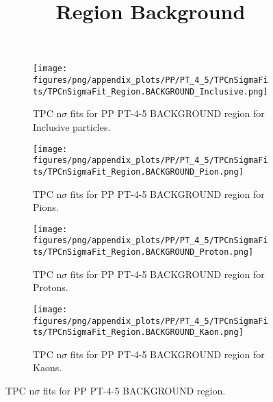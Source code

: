             \begin{figure}[H]
                \title{Region Background}
                \begin{subfigure}[b]{0.5\textwidth}
                    \centering
                    \texttt{[image: figures/png/appendix\_plots/PP/PT\_4\_5/TPCnSigmaFits/TPCnSigmaFit\_Region.BACKGROUND\_Inclusive.png]}
                    \caption{TPC n$\sigma$ fits for PP PT-4-5 BACKGROUND region for Inclusive particles.}
                    \label{fig:appendix_PP_PT-4-5_BACKGROUND_Inclusive}
                \end{subfigure}
                \begin{subfigure}[b]{0.5\textwidth}
                    \centering
                    \texttt{[image: figures/png/appendix\_plots/PP/PT\_4\_5/TPCnSigmaFits/TPCnSigmaFit\_Region.BACKGROUND\_Pion.png]}
                    \caption{TPC n$\sigma$ fits for PP PT-4-5 BACKGROUND region for Pions.}
                    \label{fig:appendix_PP_PT-4-5_BACKGROUND_Pion}
                \end{subfigure}
                \begin{subfigure}[b]{0.5\textwidth}
                    \centering
                    \texttt{[image: figures/png/appendix\_plots/PP/PT\_4\_5/TPCnSigmaFits/TPCnSigmaFit\_Region.BACKGROUND\_Proton.png]}
                    \caption{TPC n$\sigma$ fits for PP PT-4-5 BACKGROUND region for Protons.}
                    \label{fig:appendix_PP_PT-4-5_BACKGROUND_Proton}
                \end{subfigure}
                \begin{subfigure}[b]{0.5\textwidth}
                    \centering
                    \texttt{[image: figures/png/appendix\_plots/PP/PT\_4\_5/TPCnSigmaFits/TPCnSigmaFit\_Region.BACKGROUND\_Kaon.png]}
                    \caption{TPC n$\sigma$ fits for PP PT-4-5 BACKGROUND region for Kaons.}
                    \label{fig:appendix_PP_PT-4-5_BACKGROUND_Kaon}
                \end{subfigure}
                \caption{TPC n$\sigma$ fits for PP PT-4-5 BACKGROUND region.}
                \label{fig:appendix_PP_PT-4-5_BACKGROUND}
            \end{figure}
            \clearpage
            
    
